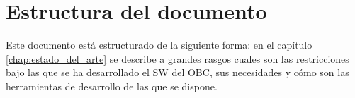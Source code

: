 \section{Estructura del documento}
\label{sec:estructura doc}

Este documento está estructurado de la siguiente forma: en el capítulo
\ref{chap:estado_del_arte} se describe a grandes rasgos cuales son las
restricciones bajo las que se ha desarrollado el SW del OBC, sus necesidades
y cómo son las herramientas de desarrollo de las que se dispone.


